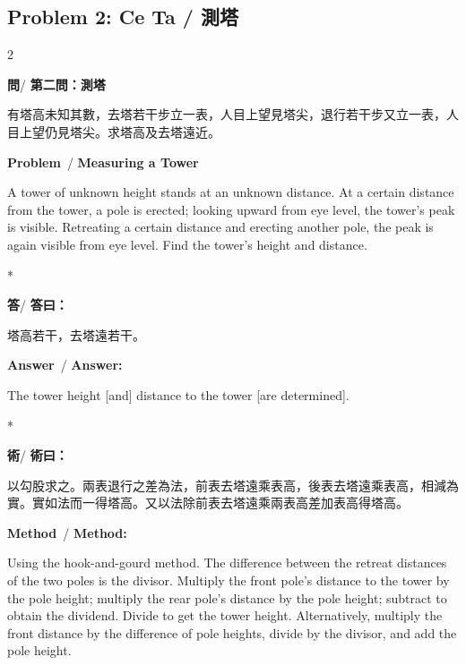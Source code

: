 \documentclass[11pt,a4paper]{article}
\newcommand{\wen}{\textbf{\color{sectioncolor}問}}
\newcommand{\da}{\textbf{\color{answercolor}答}}
\newcommand{\shu}{\textbf{\color{methodcolor}術}}
\newcommand{\prb}{\textbf{\color{sectioncolor}Problem}}
\newcommand{\ans}{\textbf{\color{answercolor}Answer}}
\newcommand{\meth}{\textbf{\color{methodcolor}Method}}
\begin{document}
\vspace{1em}

\subsection*{Problem 2: Ce Ta / 測塔}

\begin{paracol}{2}

\begin{leftcolumn*}
\wen / \textbf{第二問：測塔}

有塔高未知其數，去塔若干步立一表，人目上望見塔尖，退行若干步又立一表，人目上望仍見塔尖。求塔高及去塔遠近。
\end{leftcolumn*}

\begin{rightcolumn}
\prb\ / \textbf{Measuring a Tower}

A tower of unknown height stands at an unknown 
distance. At a certain distance from the tower, a pole is erected; 
looking upward from eye level, the tower's peak is visible. Retreating 
a certain distance and erecting another pole, the peak is again visible 
from eye level. Find the tower's height and distance.
\end{rightcolumn}

\switchcolumn[0]*

\begin{leftcolumn*}
\da / \textbf{答曰：}

塔高若干，去塔遠若干。
\end{leftcolumn*}

\begin{rightcolumn}
\ans\ / \textbf{Answer:}

The tower height [and] distance to the tower [are determined].
\end{rightcolumn}

\switchcolumn[0]*

\begin{leftcolumn*}
\shu / \textbf{術曰：}

以勾股求之。兩表退行之差為法，前表去塔遠乘表高，後表去塔遠乘表高，相減為實。實如法而一得塔高。又以法除前表去塔遠乘兩表高差加表高得塔高。
\end{leftcolumn*}

\begin{rightcolumn}
\meth\ / \textbf{Method:}

Using the hook-and-gourd method. The difference between 
the retreat distances of the two poles is the divisor. Multiply the 
front pole's distance to the tower by the pole height; multiply the rear 
pole's distance by the pole height; subtract to obtain the dividend. 
Divide to get the tower height. Alternatively, multiply the front distance 
by the difference of pole heights, divide by the divisor, and add the 
pole height.


\end{rightcolumn}
\end{paracol}
\end{document}
